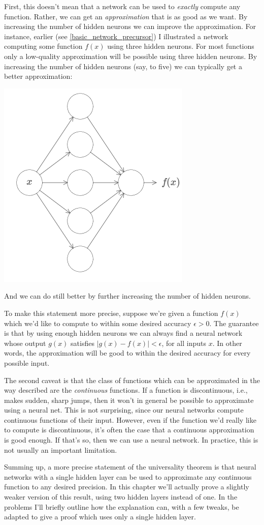 \documentclass[a4paper,twoside,10pt]{book}
\begin{document}
First, this doesn't mean that a network can be used to \textit{exactly} compute any function. Rather, we can get an \textit{approximation} that is as good as we want. By increasing the number of hidden neurons we can improve the approximation. For instance, earlier (see \ref{basic_network_precursor}) I illustrated a network computing some function $f(x)$ using three hidden neurons. For most functions only a low-quality approximation will be possible using three hidden neurons. By increasing the number of hidden neurons (say, to five) we can typically get a better approximation:
\begin{center}
	\includegraphics[width=0.43\linewidth]{figures/ch4/tikz402}
\end{center}
And we can do still better by further increasing the number of hidden neurons.

To make this statement more precise, suppose we're given a function $f(x)$ which we'd like to compute to within some desired accuracy $\epsilon>0$. The guarantee is that by using enough hidden neurons we can always find a neural network whose output $g(x)$ satisfies $|g(x)-f(x)|<\epsilon$, for all inputs $x$. In other words, the approximation will be good to within the desired accuracy for every possible input.

The second caveat is that the class of functions which can be approximated in the way described are the \textit{continuous} functions. If a function is discontinuous, i.e., makes sudden, sharp jumps, then it won't in general be possible to approximate using a neural net. This is not surprising, since our neural networks compute continuous functions of their input. However, even if the function we'd really like to compute is discontinuous, it's often the case that a continuous approximation is good enough. If that's so, then we can use a neural network. In practice, this is not usually an important limitation.

Summing up, a more precise statement of the universality theorem is that neural networks with a single hidden layer can be used to approximate any continuous function to any desired precision. In this chapter we'll actually prove a slightly weaker version of this result, using two hidden layers instead of one. In the problems I'll briefly outline how the explanation can, with a few tweaks, be adapted to give a proof which uses only a single hidden layer.
\end{document}
